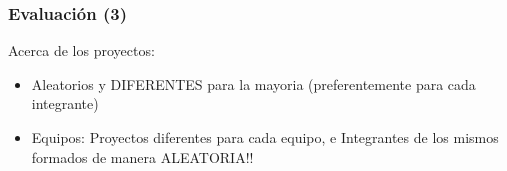 


\begin{frame}
\frametitle{Evaluación (3)}
Acerca de los proyectos:
\begin{itemize}
\item Aleatorios y DIFERENTES para la mayoria (preferentemente para cada integrante)
\item Equipos: Proyectos diferentes para cada equipo, e Integrantes de los mismos formados de manera ALEATORIA!!
\end{itemize}
\end{frame}



